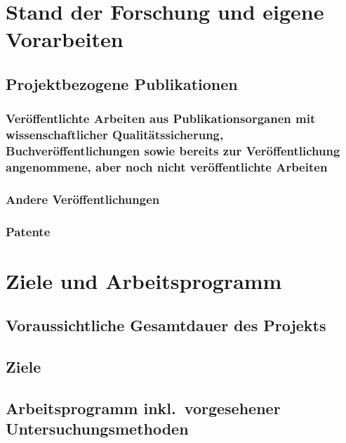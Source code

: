 \documentclass{scrartcl}
\begin{document}
\section{Stand der Forschung und eigene Vorarbeiten}

\subsection{Projektbezogene Publikationen}

\subsubsection{Veröffentlichte Arbeiten aus Publikationsorganen mit wissenschaftlicher Qualitätssicherung, Buchveröffentlichungen sowie bereits zur Veröffentlichung angenommene, aber noch nicht veröffentlichte Arbeiten}
\printbibliography[category=reviewed, heading=none]

\subsubsection{Andere Veröffentlichungen}
\printbibliography[category=nonreviewed, heading=none]

\subsubsection{Patente}

\printbibliography[category=patents_pending, heading=none]

\printbibliography[category=patents, heading=none]


\section{Ziele und Arbeitsprogramm}

\subsection{Voraussichtliche Gesamtdauer des Projekts}

\subsection{Ziele}

\subsection{Arbeitsprogramm inkl.\ vorgesehener Untersuchungsmethoden}
\end{document}
